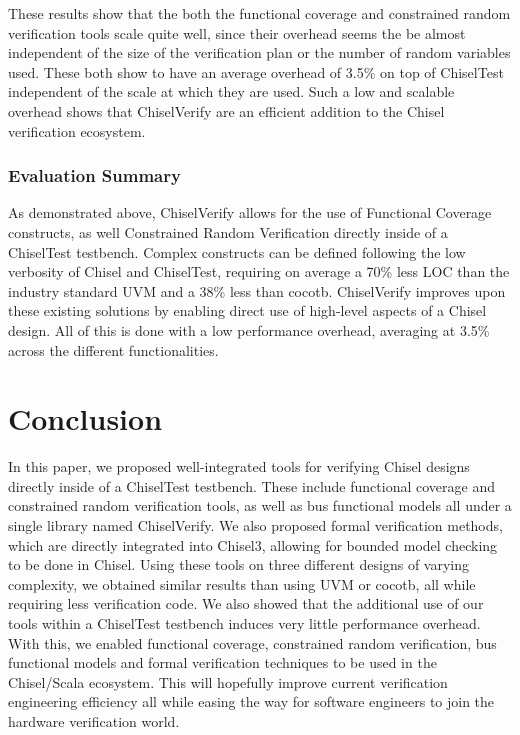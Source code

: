 \documentclass[conference]{IEEEtran}
\begin{document}
These results show that the both the functional coverage and constrained random verification tools scale quite well, since their overhead seems the be almost independent of the size of the verification plan or the number of random variables used.
These both show to have an average overhead of 3.5\% on top of ChiselTest independent of the scale at which they are used.
Such a low and scalable overhead shows that ChiselVerify are an efficient addition to the Chisel verification ecosystem.

\subsubsection{Evaluation Summary}
As demonstrated above, ChiselVerify allows for the use of Functional Coverage constructs, as well Constrained Random Verification directly inside of a ChiselTest testbench. 
Complex constructs can be defined following the low verbosity of Chisel and ChiselTest, requiring on average a 70\% less LOC than the industry standard UVM and a 38\% less than cocotb.
ChiselVerify improves upon these existing solutions by enabling direct use of high-level aspects of a Chisel design.
All of this is done with a low performance overhead, averaging at 3.5\% across the different functionalities.

\section{Conclusion}
\label{sec:conclude}

In this paper, we proposed well-integrated tools for verifying Chisel designs directly inside of a ChiselTest testbench. 
These include functional coverage and constrained random verification tools, as well as bus functional models all under a single library named ChiselVerify.
We also proposed formal verification methods, which are directly integrated into Chisel3, allowing for bounded model checking to be done in Chisel.
Using these tools on three different designs of varying complexity, we obtained similar results than using UVM or cocotb, all while requiring less verification code.
We also showed that the additional use of our tools within a ChiselTest testbench induces very little performance overhead.
With this, we enabled functional coverage, constrained random verification, bus functional models and formal verification techniques to be used in the Chisel/Scala ecosystem.
This will hopefully improve current verification engineering efficiency all while easing the way for software engineers to join the hardware verification world.
\end{document}
